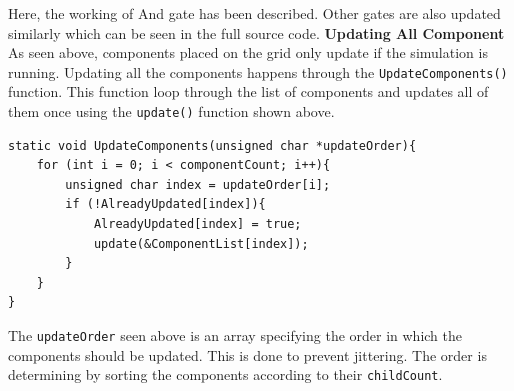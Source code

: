 \documentclass[report]{subfiles}
\begin{document}
Here, the working of And gate has been described. Other gates are also updated similarly which can be seen in the full source code.
\textbf{Updating All Component}\\
As seen above, components placed on the grid only update if the simulation is running. Updating all the components happens through the \texttt{UpdateComponents()} function.
This function loop through the list of components and updates all of them once using the \texttt{update()} function shown above.
\begin{lstlisting}
static void UpdateComponents(unsigned char *updateOrder){
    for (int i = 0; i < componentCount; i++){
        unsigned char index = updateOrder[i];
        if (!AlreadyUpdated[index]){
            AlreadyUpdated[index] = true;
            update(&ComponentList[index]);
        }
    }
}
\end{lstlisting}
The \texttt{updateOrder} seen above is an array specifying the order in which the components should be updated. This is done to prevent jittering. The order is determining by sorting the components according to their \texttt{childCount}.
\end{document}
